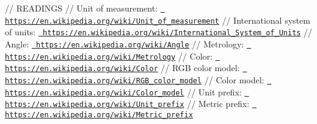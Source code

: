 // READINGS // Unit of measurement\+: \href{https://en.wikipedia.org/wiki/Unit_of_measurement}{\texttt{ https\+://en.\+wikipedia.\+org/wiki/\+Unit\+\_\+of\+\_\+measurement}} // International system of units\+: \href{https://en.wikipedia.org/wiki/International_System_of_Units}{\texttt{ https\+://en.\+wikipedia.\+org/wiki/\+International\+\_\+\+System\+\_\+of\+\_\+\+Units}} // Angle\+: \href{https://en.wikipedia.org/wiki/Angle}{\texttt{ https\+://en.\+wikipedia.\+org/wiki/\+Angle}} // Metrology\+: \href{https://en.wikipedia.org/wiki/Metrology}{\texttt{ https\+://en.\+wikipedia.\+org/wiki/\+Metrology}} // Color\+: \href{https://en.wikipedia.org/wiki/Color}{\texttt{ https\+://en.\+wikipedia.\+org/wiki/\+Color}} // RGB color model\+: \href{https://en.wikipedia.org/wiki/RGB_color_model}{\texttt{ https\+://en.\+wikipedia.\+org/wiki/\+RGB\+\_\+color\+\_\+model}} // Color model\+: \href{https://en.wikipedia.org/wiki/Color_model}{\texttt{ https\+://en.\+wikipedia.\+org/wiki/\+Color\+\_\+model}} // Unit prefix\+: \href{https://en.wikipedia.org/wiki/Unit_prefix}{\texttt{ https\+://en.\+wikipedia.\+org/wiki/\+Unit\+\_\+prefix}} // Metric prefix\+: \href{https://en.wikipedia.org/wiki/Metric_prefix}{\texttt{ https\+://en.\+wikipedia.\+org/wiki/\+Metric\+\_\+prefix}} 